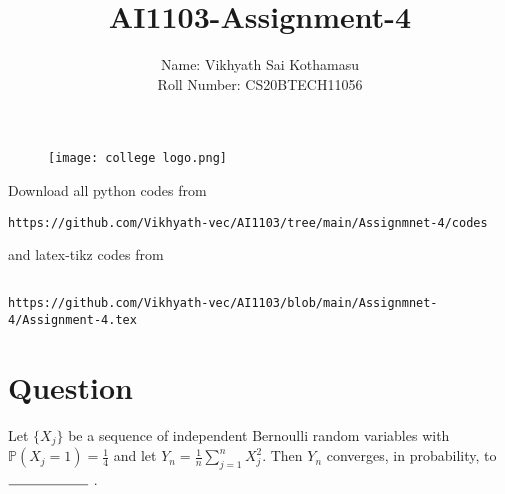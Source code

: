 \documentclass[journal,12pt,twocolumn]{IEEEtran}
\begin{document}
\title{AI1103-Assignment-4}
\author{Name: Vikhyath Sai Kothamasu\\Roll Number: CS20BTECH11056}
\maketitle
\newpage
\bigskip
\renewcommand{\thefigure}{\theenumi}
\renewcommand{\thetable}{\theenumi}

\begin{figure} [h]
    \texttt{[image: college logo.png]}
\end{figure}

Download all python codes from 
\begin{lstlisting}
https://github.com/Vikhyath-vec/AI1103/tree/main/Assignmnet-4/codes
\end{lstlisting}
%
and latex-tikz codes from 
%
\begin{lstlisting}

https://github.com/Vikhyath-vec/AI1103/blob/main/Assignmnet-4/Assignment-4.tex
\end{lstlisting}
\section*{Question}
Let $\{X_j\}$ be a sequence of independent Bernoulli random variables with $\mathbb{P}(X_j=1) = \frac{1}{4}$ and let $Y_n = \frac{1}{n} \sum_{j=1}^{n}X_j^2$. Then $Y_n$ converges, in probability, to $\rule{2cm}{0.15mm}$ .
\end{document}
